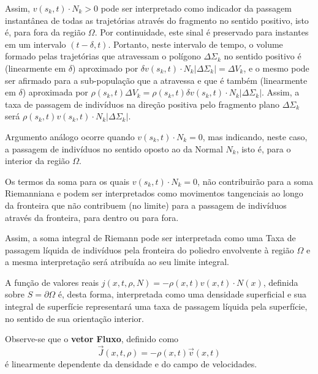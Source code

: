 
Assim, \(v(s_k, t) \cdot N_k > 0\) pode ser interpretado como indicador da passagem instantânea de todas as trajetórias através do fragmento no sentido positivo, isto é, para fora da região \(\Omega\). Por continuidade, este sinal é preservado para instantes em um intervalo \((t - \delta, t)\). Portanto, neste intervalo de tempo, o volume formado pelas trajetórias que atravessam o polígono \(\Delta \Sigma_k\) no sentido positivo é (linearmente em \(\delta\)) aproximado por \(\delta v(s_k, t) \cdot N_k|\Delta \Sigma_k| = \Delta V_k\), e o mesmo pode ser afirmado para a sub-população que a atravessa e que é também (linearmente em \(\delta\)) aproximada por \(\rho(s_k, t) \Delta V_k = \rho(s_k, t) \delta v(s_k, t) \cdot N_k|\Delta\Sigma_k|\). Assim, a taxa de passagem de indivíduos na direção positiva pelo fragmento plano \(\Delta\Sigma_k\) será \(\rho(s_k, t) v(s_k,t) \cdot N_k|\Delta\Sigma_k|\).

Argumento análogo ocorre quando \(v(s_k, t) \cdot N_k = 0\), mas indicando, neste caso, a passagem de indivíduos no sentido oposto ao da Normal \(N_k\), isto é, para o interior da região \(\Omega\).

Os termos da soma para os quais \(v(s_k, t) \cdot N_k = 0\), não contribuirão para a soma Riemanniana e podem ser interpretados como movimentos tangenciais ao longo da fronteira que não contribuem (no limite) para a passagem de indivíduos através da fronteira, para dentro ou para fora.

Assim, a soma integral de Riemann pode ser interpretada como uma Taxa de passagem líquida de indivíduos pela fronteira do poliedro envolvente à região \(\Omega\) e a mesma interpretação será atribuída ao seu limite integral.

A função de valores reais \(j(x, t, \rho, N) = -\rho(x,t) v(x,t) \cdot N(x)\), definida sobre \(S = \partial \Omega\) é, desta forma, interpretada como uma densidade superficial e sua integral de superfície representará uma taxa de passagem líquida pela superfície, no sentido de sua orientação interior.

Observe-se que o \textbf{vetor Fluxo}, definido como
\[\vec{J}(x, t, \rho) = -\rho(x,t) \vec{v}(x,t)\]
é linearmente dependente da densidade e do campo de velocidades.

